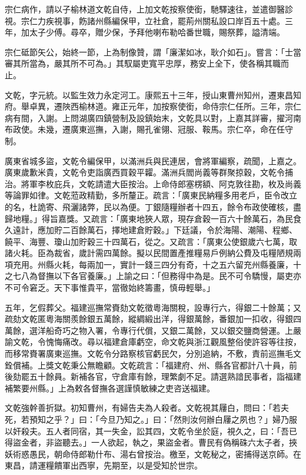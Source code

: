 \begin{pinyinscope}
宗仁病作，請以子榆林道文乾自侍，上加文乾按察使銜，馳驛速往，並遣御醫診視。宗仁力疾視事，飭諸州縣編保甲，立社倉，罷荊州關私設口岸百五十處。三年，加太子少傅。尋卒，贈少保，予拜他喇布勒哈番世職，賜祭葬，謚清端。

宗仁砥節矢公，始終一節，上為制像贊，謂「廉潔如冰，耿介如石」。嘗言：「士當審其所當為，嚴其所不可為。」其馭屬吏寬平忠厚，務安上全下，使各稱其職而止。

文乾，字元統。以監生效力永定河工。康熙五十三年，授山東曹州知州，遷東昌知府。舉卓異，遷陜西榆林道。雍正元年，加按察使銜，命侍宗仁任所。三年，宗仁病有間，入謝。上問湖廣四鎮營制及設鎮始末，文乾具以對，上嘉其詳審，擢河南布政使。未幾，遷廣東巡撫，入謝，賜孔雀翎、冠服、鞍馬。宗仁卒，命在任守制。

廣東省城多盜，文乾令編保甲，以滿洲兵與民連居，會將軍編察，疏聞，上嘉之。廣東歲歉米貴，文乾令吏詣廣西買穀平糶。滿洲兵閻尚義等群聚掠穀，文乾令捕治。將軍李枚庇兵，文乾請遣大臣按治。上命侍郎塞楞額、阿克敦往勘，枚及尚義等論罪如律。文乾蒞政精勤，多所釐正。疏言：「廣東民納糧多用老戶，臣令改立的名，杜詭寄、飛灑諸弊，民以為便。丁銀隨糧辦者十四五，餘令布政使確核，盡歸地糧。」得旨嘉獎。又疏言：「廣東地狹人眾，現存倉穀一百六十餘萬石，為民食久遠計，應加貯二百餘萬石，擇地建倉貯穀。」下廷議，令於海陽、潮陽、程鄉、饒平、海豐、瓊山加貯穀三十四萬石，從之。又疏言：「廣東公使銀歲六七萬，取諸火耗。臣為裁省，歲計需四萬餘。擬以民間置產推糧易戶例納公費及屯糧陋規兩項充用。州縣火耗，每兩加一，實計一錢三四分有奇，十之五六留充州縣養廉，十之七八為督撫以下各官養廉。」上諭之曰：「但務得中為是。民不可令驕慢，屬吏亦不可令窘乏。天下事惟貴平，當徹始終籌畫，慎毋輕舉。」

五年，乞假葬父。福建巡撫常賚劾文乾徵粵海關稅，設專行六，得銀二十餘萬；又疏劾文乾匿粵海關羨餘銀五萬餘，縱綢緞出洋，得銀萬餘，番銀加一扣收，得銀四萬餘，選洋船奇巧之物入署，令專行代償，又銀二萬餘，又以銀交鹽商營運。上嚴諭文乾，令愧悔痛改。尋以福建倉庫虧空，命文乾與浙江觀風整俗使許容等往按，而移常賚署廣東巡撫。文乾令分路察核官虧民欠，分別追納，不敷，責前巡撫毛文銓償補。上獎文乾秉公無瞻顧。文乾疏言：「福建府、州、縣各官都計八十員，前後劾罷五十餘員。新補各官，守倉庫有餘，理繁劇不足。請選熟諳民事者，詣福建補繁要州縣。」上為敕各督撫各選謹慎敏練之吏咨送福建。

文乾強幹善折獄。初知曹州，有婦告夫為人殺者。文乾視其屨白，問曰：「若夫死，若預知之乎？」曰：「今旦乃知之。」曰：「然則汝何辦白屨之夙也？」婦乃服以奸殺夫。五人者同宿，其一失金，訟其四，文乾令坐於庭，視久之，曰：「吾已得盜金者，非盜聽去。」一人欲起，執之，果盜金者。曹民有偽稱硃六太子者，挾妖術惑愚民，朝命侍郎勒什布、湯右曾按治。檄至，文乾秘之，密捕得送京師。在東昌，請運糧饋軍出西寧，先期至，以是受知於世宗。


\end{pinyinscope}
